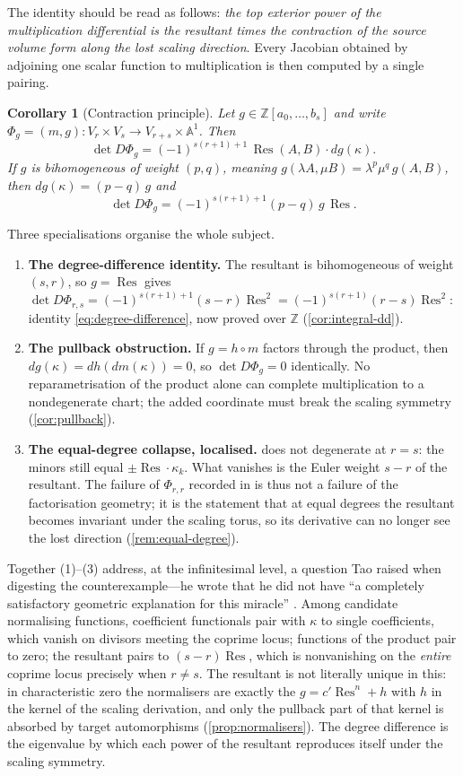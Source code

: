 \documentclass[11pt,reqno]{amsart}
\newtheorem{corollary}[corollary]{Corollary}
\theoremstyle{definition}
\theoremstyle{remark}
\newcommand{\A}{\mathbb A}
\newcommand{\Z}{\mathbb Z}
\newcommand{\Res}{\operatorname{Res}}
\begin{document}
The identity should be read as follows: \emph{the top exterior power
of the multiplication differential is the resultant times the
contraction of the source volume form along the lost scaling
direction}.  Every Jacobian obtained by adjoining one scalar function
to multiplication is then computed by a single pairing.

\begin{corollary}[Contraction principle]\label{cor:contraction}
Let $g\in\Z[a_0,\dots,b_s]$ and write
$\Phi_g=(m,g):V_r\times V_s\to V_{r+s}\times\A^1$.  Then
\[
 \det D\Phi_g=(-1)^{s(r+1)+1}\,\Res(A,B)\cdot dg(\kappa).
\]
If $g$ is bihomogeneous of weight $(p,q)$, meaning
$g(\lambda A,\mu B)=\lambda^p\mu^q\,g(A,B)$, then
$dg(\kappa)=(p-q)\,g$ and
\[
 \det D\Phi_g=(-1)^{s(r+1)+1}(p-q)\,g\,\Res .
\]
\end{corollary}

Three specialisations organise the whole subject.

\begin{enumerate}[leftmargin=2.2em]
\item \textbf{The degree-difference identity.}  The resultant is
bihomogeneous of weight $(s,r)$, so $g=\Res$ gives
$\det D\Phi_{r,s}=(-1)^{s(r+1)+1}(s-r)\Res^2
=(-1)^{s(r+1)}(r-s)\Res^2$: identity
\eqref{eq:degree-difference}, now proved over $\Z$
(\cref{cor:integral-dd}).
\item \textbf{The pullback obstruction.}  If $g=h\circ m$ factors
through the product, then $dg(\kappa)=dh(dm(\kappa))=0$, so
$\det D\Phi_g=0$ identically.  No reparametrisation of the product
alone can complete multiplication to a nondegenerate chart; the added
coordinate must break the scaling symmetry
(\cref{cor:pullback}).
\item \textbf{The equal-degree collapse, localised.}
 does not degenerate at $r=s$: the minors still
equal $\pm\Res\cdot\kappa_k$.  What vanishes is the Euler weight
$s-r$ of the resultant.  The failure of $\Phi_{r,r}$ recorded in
\cite{DDAS} is thus not a failure of the factorisation geometry; it is
the statement that at equal degrees the resultant becomes invariant
under the scaling torus, so its derivative can no longer see the lost
direction (\cref{rem:equal-degree}).
\end{enumerate}

Together (1)--(3) address, at the infinitesimal level, a question Tao
raised when digesting the counterexample---he wrote that he did
not have ``a completely satisfactory geometric explanation for this
miracle'' \cite{TaoDigestion}.  Among candidate normalising
functions, coefficient functionals pair with $\kappa$ to single
coefficients, which vanish on divisors meeting the coprime locus;
functions of the product pair to zero; the resultant pairs to
$(s-r)\Res$, which is nonvanishing on the \emph{entire} coprime locus
precisely when $r\ne s$.  The resultant is not literally unique in
this: in characteristic zero the normalisers are exactly the
$g=c'\Res^n+h$ with $h$ in the kernel of the scaling derivation, and
only the pullback part of that kernel is absorbed by target
automorphisms (\cref{prop:normalisers}).  The degree difference is
the eigenvalue by which each power of the resultant reproduces itself
under the scaling symmetry.
\end{document}
